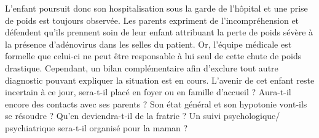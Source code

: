 L’enfant poursuit donc son hospitalisation sous la garde de l’hôpital et une prise de poids est toujours observée. Les parents expriment de l’incompréhension et défendent qu’ils prennent soin de leur enfant attribuant la perte de poids sévère à la présence d’adénovirus dans les selles du patient. Or, l’équipe médicale est formelle que celui-ci ne peut être responsable à lui seul de cette chute de poids drastique. Cependant, un bilan complémentaire afin d’exclure tout autre diagnostic pouvant expliquer la situation est en cours. L’avenir de cet enfant reste incertain à ce jour, sera-t-il placé en foyer ou en famille d’accueil ? Aura-t-il encore des contacts avec ses parents ? Son état général et son hypotonie vont-ils se résoudre ? Qu’en deviendra-t-il de la fratrie ? Un suivi psychologique/ psychiatrique sera-t-il organisé pour la maman ? 
